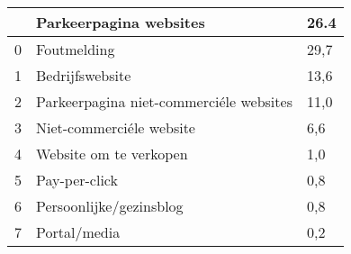 \begin{tabular}{lll}
\toprule
{} &                   Parkeerpagina websites &  26.4 \\
\midrule
0 &                              Foutmelding &  29,7 \\
1 &                          Bedrijfswebsite &  13,6 \\
2 &  Parkeerpagina niet-commerciéle websites &  11,0 \\
3 &                 Niet-commerciéle website &   6,6 \\
4 &                   Website om te verkopen &   1,0 \\
5 &                            Pay-per-click &   0,8 \\
6 &                  Persoonlijke/gezinsblog &   0,8 \\
7 &                             Portal/media &   0,2 \\
\bottomrule
\end{tabular}
